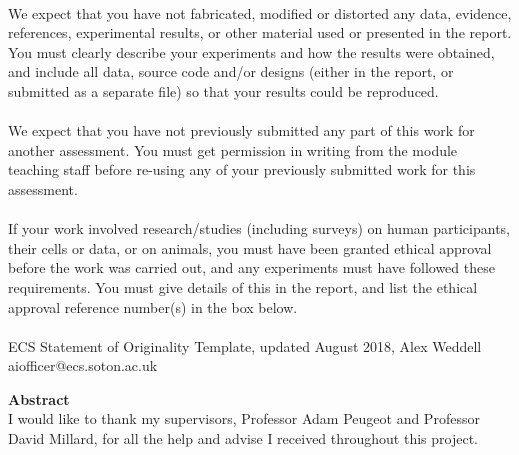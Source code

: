 \documentclass{article}
\begin{document}
\\[0.5cm]

We expect that you have not fabricated, modified or distorted any data, evidence, references,
experimental results, or other material used or presented in the report. You must clearly describe
your experiments and how the results were obtained, and include all data, source code and/or
designs (either in the report, or submitted as a separate file) so that your results could be
reproduced.\\

\\[0.5cm]

We expect that you have not previously submitted any part of this work for another assessment.
You must get permission in writing from the module teaching staff before re-using any of your
previously submitted work for this assessment.\\

\\[0.5cm]

If your work involved research/studies (including surveys) on human participants, their cells or
data, or on animals, you must have been granted ethical approval before the work was carried
out, and any experiments must have followed these requirements. You must give details of this in
the report, and list the ethical approval reference number(s) in the box below.\\

\\[0.5cm]


ECS Statement of Originality Template, updated August 2018, Alex Weddell aiofficer@ecs.soton.ac.uk\\


\newpage 

{\Huge \textbf{Abstract}}\\[1cm]


I would like to thank my supervisors, Professor Adam Peugeot and Professor David Millard, for all the help and advise I received throughout this project. \\
\end{document}
